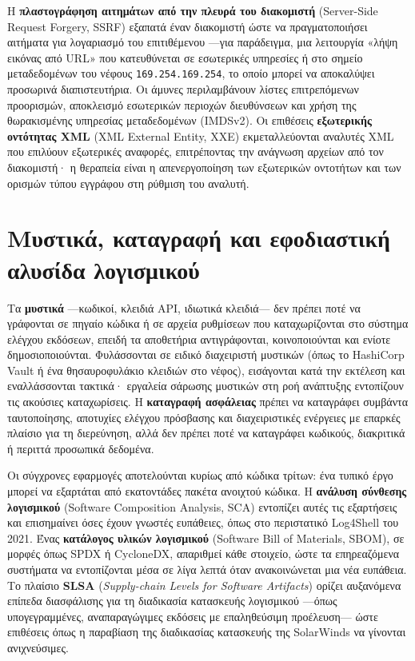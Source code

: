 \documentclass[11pt,openany]{book}
\begin{document}
Η \textbf{πλαστογράφηση αιτημάτων από την πλευρά του διακομιστή} (Server-Side Request Forgery, SSRF) εξαπατά έναν διακομιστή ώστε να πραγματοποιήσει αιτήματα για λογαριασμό του επιτιθέμενου —για παράδειγμα, μια λειτουργία «λήψη εικόνας από URL» που κατευθύνεται σε εσωτερικές υπηρεσίες ή στο σημείο μεταδεδομένων του νέφους \texttt{169.254.169.254}, το οποίο μπορεί να αποκαλύψει προσωρινά διαπιστευτήρια. Οι άμυνες περιλαμβάνουν λίστες επιτρεπόμενων προορισμών, αποκλεισμό εσωτερικών περιοχών διευθύνσεων και χρήση της θωρακισμένης υπηρεσίας μεταδεδομένων (IMDSv2). Οι επιθέσεις \textbf{εξωτερικής οντότητας XML} (XML External Entity, XXE) εκμεταλλεύονται αναλυτές XML που επιλύουν εξωτερικές αναφορές, επιτρέποντας την ανάγνωση αρχείων από τον διακομιστή· η θεραπεία είναι η απενεργοποίηση των εξωτερικών οντοτήτων και των ορισμών τύπου εγγράφου στη ρύθμιση του αναλυτή.

\section{Μυστικά, καταγραφή και εφοδιαστική αλυσίδα λογισμικού}\label{sec:9.6}
Τα \textbf{μυστικά} —κωδικοί, κλειδιά API, ιδιωτικά κλειδιά— δεν πρέπει ποτέ να γράφονται σε πηγαίο κώδικα ή σε αρχεία ρυθμίσεων που καταχωρίζονται στο σύστημα ελέγχου εκδόσεων, επειδή τα αποθετήρια αντιγράφονται, κοινοποιούνται και ενίοτε δημοσιοποιούνται. Φυλάσσονται σε ειδικό διαχειριστή μυστικών (όπως το HashiCorp Vault ή ένα θησαυροφυλάκιο κλειδιών στο νέφος), εισάγονται κατά την εκτέλεση και εναλλάσσονται τακτικά· εργαλεία σάρωσης μυστικών στη ροή ανάπτυξης εντοπίζουν τις ακούσιες καταχωρίσεις. Η \textbf{καταγραφή ασφάλειας} πρέπει να καταγράφει συμβάντα ταυτοποίησης, αποτυχίες ελέγχου πρόσβασης και διαχειριστικές ενέργειες με επαρκές πλαίσιο για τη διερεύνηση, αλλά δεν πρέπει ποτέ να καταγράφει κωδικούς, διακριτικά ή περιττά προσωπικά δεδομένα.

Οι σύγχρονες εφαρμογές αποτελούνται κυρίως από κώδικα τρίτων: ένα τυπικό έργο μπορεί να εξαρτάται από εκατοντάδες πακέτα ανοιχτού κώδικα. Η \textbf{ανάλυση σύνθεσης λογισμικού} (Software Composition Analysis, SCA) εντοπίζει αυτές τις εξαρτήσεις και επισημαίνει όσες έχουν γνωστές ευπάθειες, όπως στο περιστατικό Log4Shell του 2021. Ένας \textbf{κατάλογος υλικών λογισμικού} (Software Bill of Materials, SBOM), σε μορφές όπως SPDX ή CycloneDX, απαριθμεί κάθε στοιχείο, ώστε τα επηρεαζόμενα συστήματα να εντοπίζονται μέσα σε λίγα λεπτά όταν ανακοινώνεται μια νέα ευπάθεια. Το πλαίσιο \textbf{SLSA} (\emph{Supply-chain Levels for Software Artifacts}) ορίζει αυξανόμενα επίπεδα διασφάλισης για τη διαδικασία κατασκευής λογισμικού —όπως υπογεγραμμένες, αναπαραγώγιμες εκδόσεις με επαληθεύσιμη προέλευση— ώστε επιθέσεις όπως η παραβίαση της διαδικασίας κατασκευής της SolarWinds να γίνονται ανιχνεύσιμες.
\end{document}
